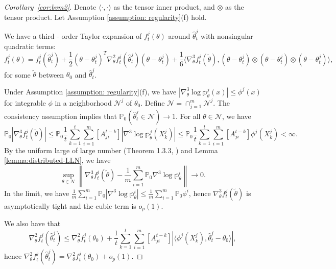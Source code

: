 \documentclass[twoside,11pt]{article}
\numberwithin{equation}{section}
\newcommand\bP{\mathbb{P}}
\newcommand\bp{\mathbb{p}}
\begin{document}
{\begin{proof}[Corollary~\ref{cor:bvm2}]
Denote $\langle \cdot, \cdot \rangle$ as the tensor inner product, and $\otimes$ as the tensor product. Let Assumption \ref{assumption: regularity}(f) hold. 

We have a third - order Taylor expansion of $f_t^j(\theta)$ around $\hat \theta_t^j$ with nonsingular quadratic terms:  
\begin{equation*}
    f_t^j(\theta) = f_t^j(\hat \theta_t^j) + \frac{1}{2} (\theta - \theta_t^j)^T \nabla_\theta^2 f_t^j(\hat \theta_t^j) (\theta - \theta_t^j) + \frac{1}{6} \langle \nabla_\theta^3 f_t^j(\tilde \theta), (\theta - \theta_t^j) \otimes (\theta - \theta_t^j) \otimes (\theta - \theta_t^j) \rangle, 
\end{equation*}
for some $\tilde \theta$ between $\theta_0$ and $\hat \theta_t^j$. 

Under Assumption \ref{assumption: regularity}(f), we have $|\nabla^3_\theta \log \bp_\theta^j(x)| \leq \phi^j(x)$ for integrable $\phi$ in a neighborhood $\mathcal N^j$ of $\theta_0$.  Define $\mathcal N = \cap_{j = 1}^m \mathcal N^j$. The consistency assumption implies that $\bP_0(\hat \theta_t^j \in \mathcal N) \to 1$. For all $\theta \in \mathcal N$, we have
\begin{equation*}
\bP_0 |\nabla_\theta^3 f_t^j(\tilde \theta)| \leq \bP_0 \frac{1}{t} \sum_{k = 1}^t \sum_{i = 1}^m [A^{t-k}_{ji}] |\nabla^3 \log \bp_\theta^j(X_k^j)| \leq \bP_0 \frac{1}{t} \sum_{k = 1}^t \sum_{i = 1}^m [A^{t-k}_{ji}] \phi^j(X_k^j) < \infty. 
\end{equation*}
By the uniform large of large number (Theorem 1.3.3, \cite{ghoshramamoorthi}) and Lemma \ref{lemma:distributed-LLN},  we have 
\begin{equation*}
    \sup_{\theta \in \mathcal N} \left\|\nabla_\theta^3 f_t^j(\tilde \theta) - \frac{1}{m}  \sum_{i = 1}^m \bP_0 \nabla^3 \log \bp_\theta^i \right\| \to 0. 
\end{equation*}
In the limit, we have $\frac{1}{m} \sum_{i = 1}^m \bP_0 |\nabla^3 \log \bp_\theta^i| \leq \frac{1}{m} \sum_{i = 1}^m \bP_0 \phi^i$, hence $\nabla_\theta^3 f_t^j(\tilde \theta)$ is asymptotically tight and the cubic term is $o_p(1)$. 

We also have that
\begin{equation*}
    \nabla_\theta^2 f_t^j(\hat \theta_t^j) \leq  \nabla_\theta^2 f_t^j(\theta_0) + \frac{1}{t} \sum_{k = 1}^t \sum_{i = 1}^m [A^{t-k}_{ji}] |\langle \phi^j(X_k^j) ,  \hat \theta_t^j - \theta_0 \rangle|, 
\end{equation*}
hence $\nabla_\theta^2 f_t^j(\hat \theta_t^j) = \nabla_\theta^2 f_t^j(\theta_0) + o_p(1)$.  


\end{proof}}
\end{document}
